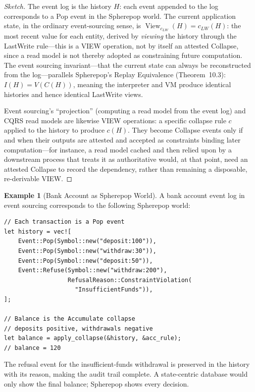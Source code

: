 \documentclass[12pt, a4paper, openany]{book}
\theoremstyle{plain}
\theoremstyle{definition}
\newtheorem{example}[theorem]{Example}
\theoremstyle{remark}
\begin{document}
\begin{proof}[Sketch]
The event log is the history $H$: each event appended to the log corresponds to
a Pop event in the Spherepop world. The current application state, in the
ordinary event-sourcing sense, is $\operatorname{View}_{c_{LW}}(H) = c_{LW}(H)$:
the most recent value for each entity, derived by \emph{viewing} the history
through the LastWrite rule---this is a VIEW operation, not by itself an
attested Collapse, since a read model is not thereby adopted as constraining
future computation. The event sourcing invariant---that the current state can
always be reconstructed from the log---parallels Spherepop's Replay Equivalence
(Theorem~10.3): $I(H) = V(C(H))$, meaning the interpreter and VM produce
identical histories and hence identical LastWrite views.

Event sourcing's ``projection'' (computing a read model from the event log) and
CQRS read models are likewise VIEW operations: a specific collapse rule $c$
applied to the history to produce $c(H)$. They become Collapse events only if
and when their outputs are attested and accepted as constraints binding later
computation---for instance, a read model cached and then relied upon by a
downstream process that treats it as authoritative would, at that point, need
an attested Collapse to record the dependency, rather than remaining a
disposable, re-derivable VIEW.
\end{proof}

\begin{example}[Bank Account as Spherepop World]
A bank account event log in event sourcing corresponds to the following Spherepop
world:
\begin{lstlisting}[style=rust, caption={Bank account as Spherepop world}]
// Each transaction is a Pop event
let history = vec![
    Event::Pop(Symbol::new("deposit:100")),
    Event::Pop(Symbol::new("withdraw:30")),
    Event::Pop(Symbol::new("deposit:50")),
    Event::Refuse(Symbol::new("withdraw:200"),
                  RefusalReason::ConstraintViolation(
                    "InsufficientFunds")),
];

// Balance is the Accumulate collapse
// deposits positive, withdrawals negative
let balance = apply_collapse(&history, &acc_rule);
// balance = 120
\end{lstlisting}
The refusal event for the insufficient-funds withdrawal is preserved in the
history with its reason, making the audit trail complete. A state-centric
database would only show the final balance; Spherepop shows every decision.
\end{example}
\end{document}
